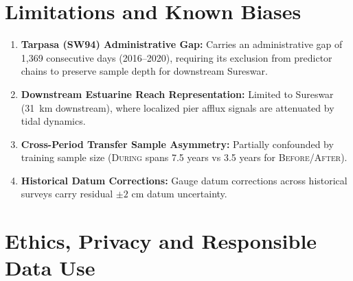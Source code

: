 \documentclass[11pt,a4paper]{article}
\begin{document}
\section{Limitations and Known Biases}

\begin{enumerate}[leftmargin=16pt,itemsep=2pt]
  \item \textbf{Tarpasa (SW94) Administrative Gap:} Carries an administrative gap of 1,369 consecutive days (2016--2020), requiring its exclusion from predictor chains to preserve sample depth for downstream Sureswar.
  \item \textbf{Downstream Estuarine Reach Representation:} Limited to Sureswar (31~km downstream), where localized pier afflux signals are attenuated by tidal dynamics.
  \item \textbf{Cross-Period Transfer Sample Asymmetry:} Partially confounded by training sample size (\textsc{During} spans 7.5 years vs 3.5 years for \textsc{Before}/\textsc{After}).
  \item \textbf{Historical Datum Corrections:} Gauge datum corrections across historical surveys carry residual $\pm 2\text{ cm}$ datum uncertainty.
\end{enumerate}

\section{Ethics, Privacy and Responsible Data Use}
\end{document}
